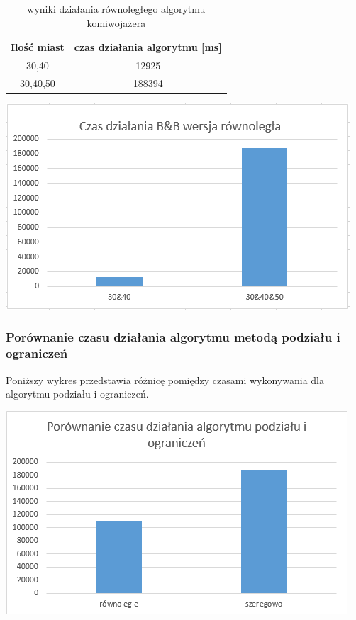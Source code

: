 \documentclass{article}
\begin{document}
		\begin{table}[H]
			\centering
			\caption{wyniki działania równoległego algorytmu komiwojażera}
			\begin{tabular}{|c|c|}
				
				\hline Ilość miast  & czas działania algorytmu [ms] \\ 
				\hline  30,40 & 12925 \\ 
				\hline  30,40,50 & 188394 \\ 
				\hline 
			\end{tabular} 
		\end{table}
		
	\begin{center}
		
		\includegraphics[width=0.7\linewidth]{bbR}
		
	\end{center}

	\subsubsection{Porównanie czasu działania algorytmu metodą podziału i ograniczeń}
	Poniższy wykres przedstawia różnicę pomiędzy czasami wykonywania dla algorytmu podziału i ograniczeń. 
	
		\begin{center}
				\includegraphics[width=0.7\linewidth]{bbRvsS}
		\end{center}
		
\end{document}
